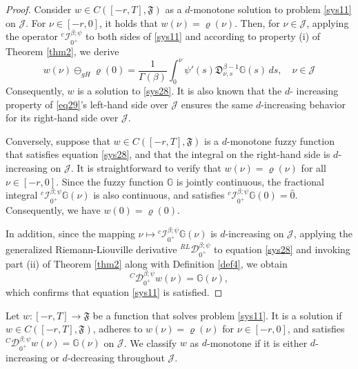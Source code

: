 \documentclass[reqno]{amsart}
\begin{document}
\begin{proof}
Consider \( w \in C([- r, T], \mathfrak{F})\) as a \(d\)-monotone solution to 
problem \eqref{sys11} on \(\mathcal{J}\). For \(\nu \in [- r, 0]\), it holds that 
\( w(\nu ) = \varrho(\nu )\). Then, for \(\nu \in \mathcal{J}\), applying the operator 
\({}^c \mathcal{I}_{0^{+}}^{\beta ; \psi}\) to both sides of \eqref{sys11} and 
according to property (i) of Theorem \ref{thm2}, we derive
\begin{equation}\label{eq29}
 w(\nu ) \ominus_{g H} \varrho(0)=\frac{1}{\Gamma(\beta)}
  \int_0^{\nu } \psi'(s)\mathfrak{D}_{\nu ,s}^{\beta-1} \mathbb{G}(s)\,ds,
  \quad \nu \in\mathcal{J} 
\end{equation}
Consequently, \( w\) is a solution to \eqref{sys28}. It is also known that the \(d\)-
increasing property of \eqref{eq29}'s left-hand side over \(\mathcal{J}\) ensures the 
same \(d\)-increasing behavior for its right-hand side over \(\mathcal{J}\).

Conversely, suppose that \( w \in C([- r, T], \mathfrak{F})\) is a \(d\)-monotone 
fuzzy function that satisfies equation \eqref{sys28}, and that the integral on the 
right-hand side is \(d\)-increasing on \(\mathcal{J}\). It is straightforward to verify 
that \( w(\nu ) = \varrho(\nu )\) for all \(\nu \in [- r, 0]\). 
Since the fuzzy function \(\mathbb{G}\) is jointly continuous, the fractional integral 
\({}^c \mathcal{I}_{0^{+}}^{\beta ; \psi} \mathbb{G}(\nu )\) is also continuous, 
and satisfies \({}^c \mathcal{I}_{0^{+}}^{\beta ; \psi} \mathbb{G}(0) = \hat{0}\). 
Consequently, we have \( w(0) = \varrho(0)\).

In addition, since the mapping 
\(\nu \mapsto {}^c \mathcal{I}_{0^{+}}^{\beta ; \psi} \mathbb{G}(\nu )\) is 
\(d\)-increasing on \(\mathcal{J}\), applying the generalized Riemann-Liouville 
derivative \({}^{RL} \mathcal{D}_{0^{+}}^{\beta ; \psi}\) to equation \eqref{sys28} 
and invoking part (ii) of Theorem \ref{thm2} along with Definition \ref{def4}, 
we obtain
\[
{}^C \mathcal{D}_{0^{+}}^{\beta ; \psi} w(\nu ) = \mathbb{G}(\nu ),
\]
which confirms that equation \eqref{sys11} is satisfied.
\end{proof}

\begin{definition} \label{def5} \rm
Let \( w : [- r, T] \to \mathfrak{F}\) be a function that solves problem \eqref{sys11}. 
It is a solution if \( w \in C([- r, T], \mathfrak{F})\), adheres to 
\( w(\nu ) = \varrho(\nu )\) for \(\nu \in [- r, 0]\), and satisfies 
\({}^C \mathcal{D}_{0^{+}}^{\beta ; \psi} w(\nu ) = \mathbb{G}(\nu )\) on 
\(\mathcal{J}\). We classify \( w\) as \(d\)-monotone if it is either \(d\)-increasing
or \(d\)-decreasing throughout \(\mathcal{J}\).
\end{definition}
\end{document}
